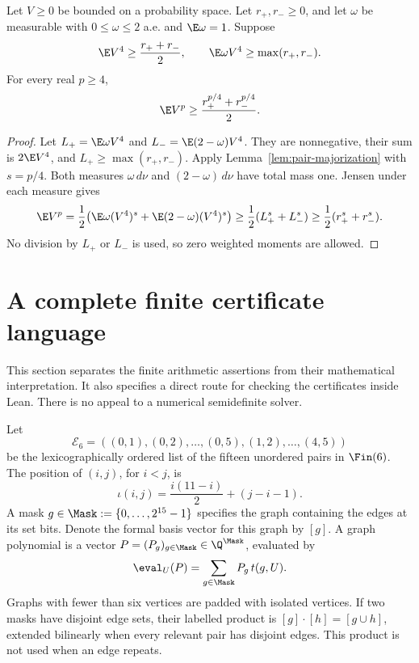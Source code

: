 \begin{lemma}
\label{lem:length-lifting}
\proved Let $V\ge0$ be bounded on a probability space.  Let $r_+,r_-\ge0$, and let $\omega$
be measurable with $0\le\omega\le2$ a.e. and $\E\omega=1$.  Suppose
\[
 \E V^4\ge\frac{r_++r_-}{2},\qquad
 \E\omega V^4\ge\max(r_+,r_-).
\]
For every real $p\ge4$,
\[
 \E V^p\ge\frac{r_+^{p/4}+r_-^{p/4}}2.
\]
\end{lemma}
\begin{proof}
Let $L_+=\E\omega V^4$ and $L_-=\E(2-\omega)V^4$.  They are nonnegative, their sum is
$2\E V^4$, and $L_+\ge\max(r_+,r_-)$.  Apply Lemma~\ref{lem:pair-majorization} with
$s=p/4$.  Both measures $\omega\,d\nu$ and $(2-\omega)\,d\nu$ have total mass one.
Jensen under each measure gives
\[
 \E V^p
 =\frac12\bigl(\E\omega(V^4)^s+\E(2-\omega)(V^4)^s\bigr)
 \ge\frac12(L_+^s+L_-^s)
 \ge\frac12(r_+^s+r_-^s).
\]
No division by $L_+$ or $L_-$ is used, so zero weighted moments are allowed.
\end{proof}

\section{A complete finite certificate language}
\label{sec:certificate-language}

This section separates the finite arithmetic assertions from their mathematical
interpretation.  It also specifies a direct route for checking the certificates inside Lean.
There is no appeal to a numerical semidefinite solver.

\begin{definition}
\label{def:graph-polynomial}
Let
\[
 \mathcal E_6=((0,1),(0,2),\ldots,(0,5),(1,2),\ldots,(4,5))
\]
be the lexicographically ordered list of the fifteen unordered pairs in $\Fin(6)$.
The position of $(i,j)$, for $i<j$, is
\[
 \iota(i,j)=\frac{i(11-i)}2+(j-i-1).
\]
A mask $g\in\Mask:=\{0,\ldots,2^{15}-1\}$ specifies the graph containing the edges at its
set bits.  Denote the formal basis vector for this graph by $[g]$.  A graph polynomial is a
vector $P=(P_g)_{g\in\Mask}\in\Q^{\Mask}$, evaluated by
\[
 \eval_U(P)=\sum_{g\in\Mask}P_g\,t(g,U).
\]
Graphs with fewer than six vertices are padded with isolated vertices.  If two masks have
disjoint edge sets, their labelled product is $[g]\cdot[h]=[g\cup h]$, extended bilinearly
when every relevant pair has disjoint edges.  This product is not used when an edge repeats.
\end{definition}

